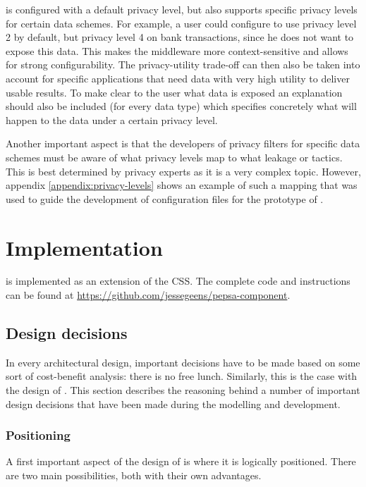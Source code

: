 \middleware{} is configured with a default privacy level, but also supports specific privacy levels for certain data schemes. For example, a user could configure \middleware{} to use privacy level 2 by default, but privacy level 4 on bank transactions, since he does not want to expose this data. This makes the middleware more context-sensitive and allows for strong configurability. The privacy-utility trade-off can then also be taken into account for specific applications that need data with very high utility to deliver usable results. To make clear to the user what data is exposed an explanation should also be included (for every data type) which specifies concretely what will happen to the data under a certain privacy level.

Another important aspect is that the developers of privacy filters for specific data schemes must be aware of what privacy levels map to what leakage or tactics. This is best determined by privacy experts as it is a very complex topic. However, appendix \ref{appendix:privacy-levels} shows an example of such a mapping that was used to guide the development of configuration files for the prototype of \middleware{}.

\section{Implementation}

\middleware{} is implemented as an extension of the \acrlong{CSS}. The complete code and instructions can be found at \url{https://github.com/jessegeens/pepsa-component}.

\subsection{Design decisions}
In every architectural design, important decisions have to be made based on some sort of cost-benefit analysis: there is no free lunch. Similarly, this is the case with the design of \middleware{}. This section describes the reasoning behind a number of important design decisions that have been made during the modelling and development.

\subsubsection{Positioning}
A first important aspect of the design of \middleware{} is where it is logically positioned. There are two main possibilities, both with their own advantages. 

